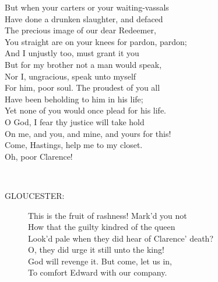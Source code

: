 \documentclass{article}
\begin{document}
\begin{description}
\hspace{1pt}But when your carters or your waiting-vassals\\
\hspace{1pt}Have done a drunken slaughter, and defaced\\
\hspace{1pt}The precious image of our dear Redeemer,\\
\hspace{1pt}You straight are on your knees for pardon, pardon;\\
\hspace{1pt}And I unjustly too, must grant it you\\
\hspace{1pt}But for my brother not a man would speak,\\
\hspace{1pt}Nor I, ungracious, speak unto myself\\
\hspace{1pt}For him, poor soul. The proudest of you all\\
\hspace{1pt}Have been beholding to him in his life;\\
\hspace{1pt}Yet none of you would once plead for his life.\\
\hspace{1pt}O God, I fear thy justice will take hold\\
\hspace{1pt}On me, and you, and mine, and yours for this!\\
\hspace{1pt}Come, Hastings, help me to my closet.\\
\hspace{1pt}Oh, poor Clarence!\\
\end{description}
\\
\begin{description}
\item[GLOUCESTER:] 
\hspace{1pt}This is the fruit of rashness! Mark'd you not\\
\hspace{1pt}How that the guilty kindred of the queen\\
\hspace{1pt}Look'd pale when they did hear of Clarence' death?\\
\hspace{1pt}O, they did urge it still unto the king!\\
\hspace{1pt}God will revenge it. But come, let us in,\\
\hspace{1pt}To comfort Edward with our company.\\
\end{description}
\end{document}
